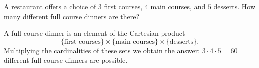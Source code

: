 \begin{exl}
A restaurant offers a choice of $3$ first courses, $4$ main courses, and $5$ desserts.
How many different full course dinners are there?

A full course dinner is an element of the Cartesian product
\[
\{\text{first courses}\} \times \{\text{main courses}\} \times \{\text{desserts}\}.
\]
Multiplying the cardinalities of these sets we obtain the answer: $3 \cdot 4 \cdot 5 = 60$ different full course dinners are possible.
\end{exl}